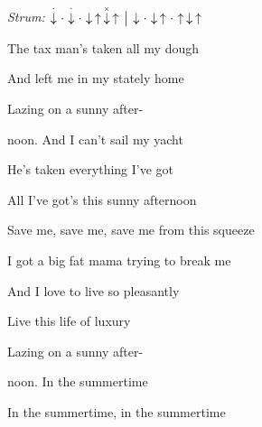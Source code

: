 \begin{song}


\begin{headerbox}
\RaiseBoxWithChucks
\textit{Strum:} $\StaccatoDown\Miss\StaccatoDown\Miss\Down\Up\ChuckDown\Up
\Separator \Down\Miss\Down\Up\Miss\Up\Down\Up$
\end{headerbox}

\begin{vchordbox}
\end{vchordbox}

\large

\bigskip

\Intro {}    \par

\bigskip

The tax man's taken all my dough \par
And left me in my stately home \par
{}Lazing on a sunny after- \par
{}noon. And I can't sail my yacht \par
He's taken everything I've got \par
{}All I've got's this sunny afternoon \par

\bigskip

Save me, save me, save me from this squeeze \par
I got a big fat mama trying to break me  \par

\bigskip

\begin{chorusbox}{\Chorus}
And I love to live so pleasantly \par
{}Live this life of luxury  \par
{}Lazing on a sunny after- \par
{}noon. In the summertime \par
In the summertime, in the summertime \par
\end{chorusbox}


\end{song}
